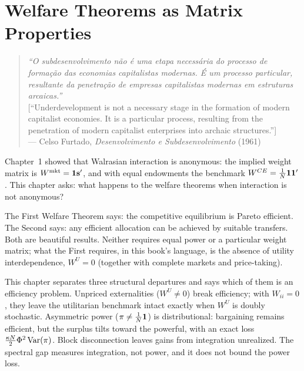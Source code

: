 \documentclass[../structural_economics_book.tex]{subfiles}
\begin{document}
\ifSubfilesClassLoaded{\setcounter{chapter}{1}}{}
\chapter{Welfare Theorems as Matrix Properties}\label{ch:02}
\begin{quote}
\textit{``O subdesenvolvimento n\~{a}o \'{e} uma etapa necess\'{a}ria do processo de forma\c{c}\~{a}o das economias capitalistas modernas. \'{E} um processo particular, resultante da penetra\c{c}\~{a}o de empresas capitalistas modernas em estruturas arcaicas.''}\\[0.3em]
\textnormal{[``Underdevelopment is not a necessary stage in the formation of modern capitalist economies. It is a particular process, resulting from the penetration of modern capitalist enterprises into archaic structures.'']}\\
\hfill --- Celso Furtado, \textit{Desenvolvimento e Subdesenvolvimento} (1961)
\end{quote}
\nocite{furtado1961desenvolvimento}

\vspace{1em}

Chapter~1 showed that Walrasian interaction is anonymous: the implied weight matrix is $W^{\text{mkt}} = \mathbf{1}\mathbf{s}'$, and with equal endowments the benchmark $W^{CE} = \frac{1}{N}\mathbf{1}\mathbf{1}'$. This chapter asks: what happens to the welfare theorems when interaction is not anonymous?

The First Welfare Theorem says: the competitive equilibrium is Pareto efficient. The Second says: any efficient allocation can be achieved by suitable transfers. Both are beautiful results. Neither requires equal power or a particular weight matrix; what the First requires, in this book's language, is the absence of utility interdependence, $W^U = 0$ (together with complete markets and price-taking).

This chapter separates three structural departures and says which of them is an efficiency problem. Unpriced externalities ($W^U \neq 0$) break efficiency; with $W_{ii} = 0$, they leave the utilitarian benchmark intact exactly when $W^U$ is doubly stochastic. Asymmetric power ($\pi \neq \frac{1}{N}\mathbf{1}$) is distributional: bargaining remains efficient, but the surplus tilts toward the powerful, with an exact loss $\frac{\kappa N}{2}\Phi^2\operatorname{Var}(\pi)$. Block disconnection leaves gains from integration unrealized. The spectral gap measures integration, not power, and it does not bound the power loss.
\end{document}
